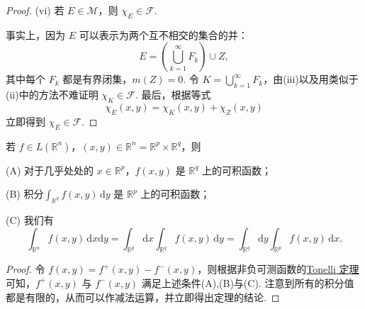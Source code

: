 \documentclass[../../main.tex]{subfiles}%
\begin{document}
\begin{proof}
(vi) 若 \( E \in \mathcal{M} \)，则 \( \chi_E \in \mathcal{F} \).

事实上，因为 \( E \) 可以表示为两个互不相交的集合的并：
\[
E = \left( \bigcup_{k = 1}^{\infty} F_k \right) \cup Z,
\]
其中每个 \( F_k \) 都是有界闭集，\( m(Z) = 0 \). 令 \( K = \bigcup_{k = 1}^{\infty} F_k \)，由(iii)以及用类似于(ii)中的方法不难证明 \( \chi_K \in \mathcal{F} \). 最后，根据等式
\[
\chi_E(x, y) = \chi_K(x, y) + \chi_Z(x, y)
\]
立即得到 \( \chi_E \in \mathcal{F} \).
\end{proof}

\begin{theorem}\label{theorem:实变函数Rn-Fubini定理}
若 \( f \in L(\mathbb{R}^n) \)，\( (x, y) \in \mathbb{R}^n = \mathbb{R}^p \times \mathbb{R}^q \)，则

(A) 对于几乎处处的 \( x \in \mathbb{R}^p \)，\( f(x, y) \) 是 \( \mathbb{R}^q \) 上的可积函数；

(B) 积分$\int_{\mathbb{R}^q} f(x, y) \, \mathrm{d}y$
是 \( \mathbb{R}^p \) 上的可积函数；

(C) 我们有
\[
\int_{\mathbb{R}^n} f(x, y) \, \mathrm{d}x\mathrm{d}y = \int_{\mathbb{R}^p} \mathrm{d}x \int_{\mathbb{R}^q} f(x, y) \, \mathrm{d}y = \int_{\mathbb{R}^q} \mathrm{d}y \int_{\mathbb{R}^p} f(x, y) \, \mathrm{d}x.
\]
\end{theorem}
\begin{proof}
令 \( f(x, y) = f^+(x, y) - f^-(x, y) \)，则根据非负可测函数的\hyperref[theorem:Tonelli定理(非负可测函数的情形)]{Tonelli 定理}可知，\( f^+(x, y) \) 与 \( f^-(x, y) \) 满足上述条件(A),(B)与(C). 注意到所有的积分值都是有限的，从而可以作减法运算，并立即得出定理的结论.
\end{proof}
\end{document}
